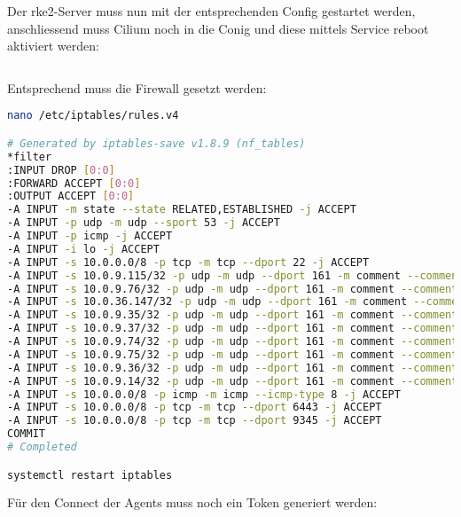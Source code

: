 Der rke2-Server muss nun mit der entsprechenden Config gestartet werden, anschliessend muss Cilium noch in die Conig und diese mittels Service reboot aktiviert werden:
\lstset{style=gra_codestyle}
\begin{lstlisting}[language=bash, caption=rke2 server starten,captionpos=b,label={lst:rke2-server-start},breaklines=true]

\end{lstlisting}

Entsprechend muss die Firewall gesetzt werden:
\lstset{style=gra_codestyle}
\begin{lstlisting}[language=bash, caption=iptables entries server,captionpos=b,label={lst:iptables-server-entries},breaklines=true]
nano /etc/iptables/rules.v4

# Generated by iptables-save v1.8.9 (nf_tables)
*filter
:INPUT DROP [0:0]
:FORWARD ACCEPT [0:0]
:OUTPUT ACCEPT [0:0]
-A INPUT -m state --state RELATED,ESTABLISHED -j ACCEPT
-A INPUT -p udp -m udp --sport 53 -j ACCEPT
-A INPUT -p icmp -j ACCEPT
-A INPUT -i lo -j ACCEPT
-A INPUT -s 10.0.0.0/8 -p tcp -m tcp --dport 22 -j ACCEPT
-A INPUT -s 10.0.9.115/32 -p udp -m udp --dport 161 -m comment --comment "Allow SNMP for probe 10.0.9.115" -j ACCEPT
-A INPUT -s 10.0.9.76/32 -p udp -m udp --dport 161 -m comment --comment "Allow SNMP for probe 10.0.9.76" -j ACCEPT
-A INPUT -s 10.0.36.147/32 -p udp -m udp --dport 161 -m comment --comment "Allow SNMP for probe 10.0.36.147" -j ACCEPT
-A INPUT -s 10.0.9.35/32 -p udp -m udp --dport 161 -m comment --comment "Allow SNMP for probe 10.0.9.35" -j ACCEPT
-A INPUT -s 10.0.9.37/32 -p udp -m udp --dport 161 -m comment --comment "Allow SNMP for probe 10.0.9.37" -j ACCEPT
-A INPUT -s 10.0.9.74/32 -p udp -m udp --dport 161 -m comment --comment "Allow SNMP for probe 10.0.9.74" -j ACCEPT
-A INPUT -s 10.0.9.75/32 -p udp -m udp --dport 161 -m comment --comment "Allow SNMP for probe 10.0.9.75" -j ACCEPT
-A INPUT -s 10.0.9.36/32 -p udp -m udp --dport 161 -m comment --comment "Allow SNMP for probe 10.0.9.36" -j ACCEPT
-A INPUT -s 10.0.9.14/32 -p udp -m udp --dport 161 -m comment --comment "Allow SNMP for probe 10.0.9.14" -j ACCEPT
-A INPUT -s 10.0.0.0/8 -p icmp -m icmp --icmp-type 8 -j ACCEPT
-A INPUT -s 10.0.0.0/8 -p tcp -m tcp --dport 6443 -j ACCEPT
-A INPUT -s 10.0.0.0/8 -p tcp -m tcp --dport 9345 -j ACCEPT
COMMIT
# Completed

systemctl restart iptables
\end{lstlisting}

Für den Connect der Agents muss noch ein Token generiert werden:
\begin{lstlisting}[language=bash, caption=rke2 server token,captionpos=b,label={lst:rke2-server-token},breaklines=true]
\end{lstlisting}

